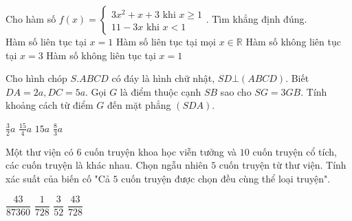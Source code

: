 \documentclass[12pt,a4paper]{article}
\begin{document}
\begin{ex}
 Cho hàm số $f(x)=\left\{ \begin{array}{l} 
  3 x^{2} + x + 3 \text{ khi } x \ge 1  \\ 
 11 - 3 x \text{          khi  } x < 1  
 \end{array} \right.$. Tìm khẳng định đúng.\\ 
\choice
{ Hàm số liên tục tại $x=1$ }
   { Hàm số liên tục tại mọi $x\in \mathbb{R}$ }
     { Hàm số không liên tục tại $x=3$ }
    { \True Hàm số không liên tục tại $x=1$ }
\loigiai{ 
  
 }\end{ex}

\begin{ex}
 Cho hình chóp ${S.ABCD}$ có đáy là hình chữ nhật, $SD\bot (ABCD)$. Biết $DA=2a,DC=5a$. Gọi ${G}$ là điểm thuộc cạnh ${SB}$ sao cho $S{G}=3GB$. Tính khoảng cách từ điểm ${G}$ đến mặt phẳng $(SDA)$.\\ 

\choice
{ ${\frac{3}{2}a}$ }
   { \True ${\frac{15}{4}a}$ }
     { ${15a}$ }
    { ${\frac{8}{3}a}$ }
\end{ex}

\begin{ex}
 Một thư viện có ${6}$ cuốn truyện khoa học viễn tưởng và ${10}$ cuốn truyện cổ tích, các cuốn truyện là khác nhau. Chọn ngẫu nhiên ${5}$ cuốn truyện từ thư viện. Tính xác suất của biến cố "Cả ${5}$ cuốn truyện được chọn đều cùng thể loại truyện".
 
\choice
{ ${\dfrac{43}{87360}}$ }
   { ${\dfrac{1}{728}}$ }
     { ${\dfrac{3}{52}}$ }
    { \True ${\dfrac{43}{728}}$ }
\end{ex}
\end{document}
